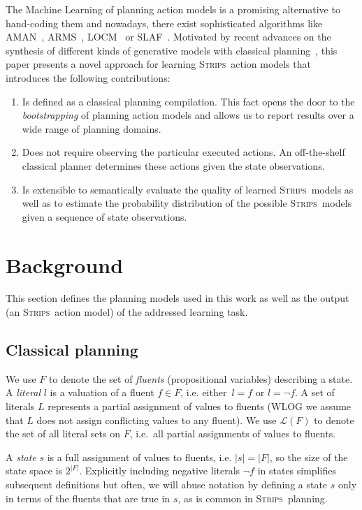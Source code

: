 \documentclass{article}
\newcommand{\strips}{\textsc{Strips}}     %
\begin{document}
The Machine Learning of planning action models is a promising alternative to hand-coding them and nowadays, there exist sophisticated algorithms like {\sc AMAN}~\cite{zhuo2013action}, {\sc ARMS}~\cite{yang2007learning}, {\sc LOCM}~\cite{cresswell2013acquiring} or {\sc SLAF}~\cite{amir:alearning:JAIR08}. Motivated by recent advances on the synthesis of different kinds of generative models with classical planning~\cite{bonet2009automatic,segovia2016hierarchical,segovia2017generating}, this paper presents a novel approach for learning \strips\ action models that introduces the following contributions:

\begin{enumerate}
\item Is defined as a classical planning compilation. This fact opens the door to the {\em bootstrapping} of planning action models and allows us to report results over a wide range of planning domains.
\item Does not require observing the particular executed actions. An off-the-shelf classical planner determines these actions given the state observations.
\item Is extensible to semantically evaluate the quality of learned \strips\ models as well as to estimate the probability distribution of the possible \strips\ models given a sequence of state observations.
\end{enumerate}


\section{Background}
This section defines the planning models used in this work as well as the output (an \strips\ action model) of the addressed learning task.

\subsection{Classical planning}
We use $F$ to denote the set of {\em fluents} (propositional variables) describing a state. A {\em literal} $l$ is a valuation of a fluent $f\in F$, i.e. either~$l=f$ or $l=\neg f$. A set of literals $L$ represents a partial assignment of values to fluents (WLOG we assume that $L$ does not assign conflicting values to any fluent). We use $\mathcal{L}(F)$ to denote the set of all literal sets on $F$, i.e.~all partial assignments of values to fluents.

A {\em state} $s$ is a full assignment of values to fluents, i.e. $|s|=|F|$, so the size of the state space is $2^{|F|}$. Explicitly including negative literals $\neg f$ in states simplifies subsequent definitions but often, we will abuse notation by defining a state $s$ only in terms of the fluents that are true in $s$, as is common in \strips\ planning.
\end{document}
